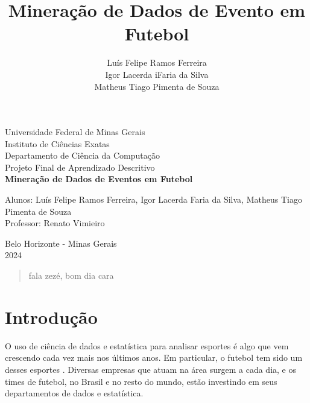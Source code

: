 \documentclass{article}
\begin{document}
\begin{titlepage}
	\begin{center}
		{\large Universidade Federal de Minas Gerais}\\[0.2cm]
		{\large Instituto de Ciências Exatas}\\[0.2cm]
		{\large Departamento de Ciência da Computação}\\[0.2cm]
		{\large Projeto Final de Aprendizado Descritivo}\\[5.1cm]
		{\large \bf Mineração de Dados de Eventos em Futebol}\\[5.1cm]
	\end{center}
	{\large Alunos: Luís Felipe Ramos Ferreira, Igor Lacerda Faria da
	Silva,
	Matheus Tiago Pimenta de Souza}\\[0.7cm]
	{\large Professor: Renato Vimieiro}\\[5.1cm]
	\begin{center}
		{\large Belo Horizonte - Minas Gerais}\\[0.2cm]
		{\large 2024}
	\end{center}
\end{titlepage}

\newpage
\begin{quote}
	fala zezé, bom dia cara
\end{quote}

\newpage
\renewcommand{\contentsname}{Sumário}
\tableofcontents
\newpage

\title{Mineração de Dados de Evento em Futebol}
\author{Luís Felipe Ramos Ferreira \\  Igor Lacerda iFaria da Silva \\ Matheus
	Tiago Pimenta de Souza}

\maketitle

\section{Introdução}

O uso de ciência de dados e estatística para analisar esportes é algo que vem
crescendo cada vez mais nos últimos anos. Em
particular, o futebol tem sido um desses
esportes \cite{takvorian2021beautiful}. Diversas empresas que atuam na
área surgem a cada dia, e os times de futebol, no Brasil e no resto do
mundo, estão investindo em seus departamentos de dados e estatística.
\end{document}
